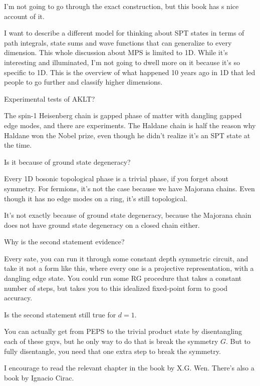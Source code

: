 I'm not going to go through the exact construction,
but this book has s nice account of it.

I want to describe a different model for thinking about SPT states in terms of
path integrals,
state sums and wave functions that can generalize to every dimension.
This whole discussion about MPS is limited to 1D.
While it's interesting and illuminated,
I'm not going to dwell more on it because it's so specific to 1D.
This is the overview of what happened 10 years ago in 1D that led people to go
further and classify higher dimensions.

\begin{question}
    Experimental tests of AKLT?
\end{question}
The spin-1 Heisenberg chain is gapped phase of matter with dangling gapped edge
modes,
and there are experiments.
The Haldane chain is half the reason why Haldane won the Nobel prize,
even though he didn't realize it's an SPT state at the time.

\begin{question}
    Is it because of ground state degeneracy?
\end{question}
Every 1D bosonic topological phase is a trivial phase,
if you forget about symmetry.
For fermions,
it's not the case because we have Majorana chains.
Even though it has no edge modes on a ring,
it's still topological.

It's not exactly because of ground state degeneracy,
because the Majorana chain does not have ground state degeneracy on a closed
chain either.

\begin{question}
    Why is the second statement evidence?
\end{question}
Every sate,
you can run it through some constant depth symmetric circuit,
and take it not a form like this,
where every one is a projective representation,
with a dangling edge state.
You could run some RG procedure that takes a constant number of steps,
but takes you to this idealized fixed-point form to good accuracy.

\begin{qeustion}
    Is the second statement still true for $d=1$.
\end{qeustion}
You can actually get from PEPS to the trivial product state by disentangling
each of these guys,
but he only way to do that is break the symmetry $G$.
But to fully disentangle,
you need that one extra step to break the symmetry.

I encourage to read the relevant chapter in the book by X.G. Wen.
There's also a book by Ignacio Cirac.

